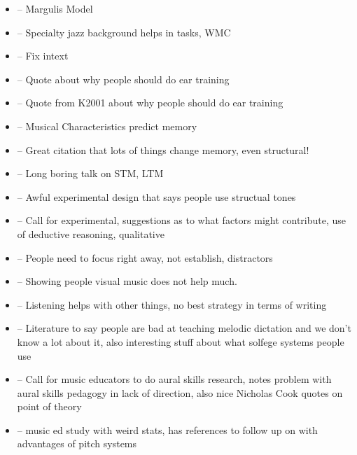 \documentclass[]{book}
\providecommand{\tightlist}{%
  \setlength{\itemsep}{0pt}\setlength{\parskip}{0pt}}
\theoremstyle{definition}
\theoremstyle{definition}
\theoremstyle{definition}
\theoremstyle{remark}
\begin{document}
\begin{itemize}
\tightlist
\item
  \citep{margulisModelMelodicExpectation2005} -- Margulis Model
\item
  \citep{nicholsScoreOneJazz2018} -- Specialty jazz background helps in
  tasks, WMC
\item
  \citep{NASM201718HandbookPdf2018} -- Fix intext
\item
  \citep{schumann1860musikalische} -- Quote about why people should do
  ear training
\item
  \citep{smith1934solfege} -- Quote from K2001 about why people should
  do ear training
\item
  \citep{longRelationshipsPitchMemory1977} -- Musical Characteristics
  predict memory
\item
  \citep{taylorStrategiesMemoryShort1983} -- Great citation that lots of
  things change memory, even structural!
\item
  \citep{tallaricoStudyThreePhase1974} -- Long boring talk on STM, LTM
\item
  \citep{ouraConstructingRepresentationMelody1991a} -- Awful
  experimental design that says people use structual tones
\item
  \citep{buonviriExplorationUndergraduateMusic2014} -- Call for
  experimental, suggestions as to what factors might contribute, use of
  deductive reasoning, qualitative
\item
  \citep{buonviriEffectsPreparatorySinging2015} -- People need to focus
  right away, not establish, distractors
\item
  \citep{buonviriEffectsMusicNotation2015} -- Showing people visual
  music does not help much.
\item
  \citep{buonviriEffectsTwoListening2017} -- Listening helps with other
  things, no best strategy in terms of writing
\item
  \citep{buonviriMelodicDictationInstruction2015} -- Literature to say
  people are bad at teaching melodic dictation and we don't know a lot
  about it, also interesting stuff about what solfege systems people use
\item
  \citep{davidbutlerWhyGulfMusic1997a} -- Call for music educators to do
  aural skills research, notes problem with aural skills pedagogy in
  lack of direction, also nice Nicholas Cook quotes on point of theory
\item
  \citep{furbyEffectsPeerTutoring2016} -- music ed study with weird
  stats, has references to follow up on with advantages of pitch systems

\end{itemize}
\end{document}
